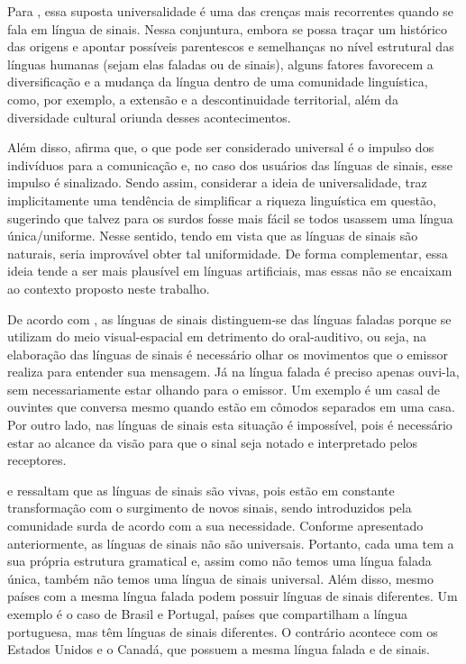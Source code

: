 Para , essa suposta universalidade é uma das crenças mais recorrentes quando se fala em língua de sinais. Nessa conjuntura, embora se possa traçar um histórico das origens e apontar possíveis parentescos e semelhanças no nível estrutural das línguas humanas (sejam elas faladas ou de sinais), alguns fatores favorecem a diversificação e a mudança da língua dentro de uma comunidade linguística, como, por exemplo, a extensão e a descontinuidade territorial, além da diversidade cultural oriunda desses acontecimentos.

Além disso,  afirma que, o que pode ser considerado universal é o impulso dos indivíduos para a comunicação e, no caso dos usuários das línguas de sinais, esse impulso é sinalizado. Sendo assim, considerar a ideia de universalidade, traz implicitamente uma tendência de simplificar a riqueza linguística em questão, sugerindo que talvez para os surdos fosse mais fácil se todos usassem uma língua única/uniforme. Nesse sentido, tendo em vista que as línguas de sinais são naturais, seria improvável obter tal uniformidade. De forma complementar, essa ideia tende a ser mais plausível em línguas artificiais, mas essas não se encaixam ao contexto proposto neste trabalho.

De acordo com , as línguas de sinais distinguem-se das línguas faladas porque se utilizam do meio visual-espacial em detrimento do oral-auditivo, ou seja, na elaboração das línguas de sinais é necessário olhar os movimentos que o emissor realiza para entender sua mensagem. Já na língua falada é preciso apenas ouvi-la, sem necessariamente estar olhando para o emissor. Um exemplo é um casal de ouvintes que conversa mesmo quando estão em cômodos separados em uma casa. Por outro lado, nas línguas de sinais esta situação é impossível, pois é necessário estar ao alcance da visão para que o sinal seja notado e interpretado pelos receptores.

 e  ressaltam que as línguas de sinais são vivas, pois estão em constante transformação com o surgimento de novos sinais, sendo introduzidos pela comunidade surda de acordo com a sua necessidade. Conforme apresentado anteriormente, as línguas de sinais não são universais. Portanto, cada uma tem a sua própria estrutura gramatical e, assim como não temos uma língua falada única, também não temos uma língua de sinais universal. Além disso, mesmo países com a mesma língua falada podem possuir línguas de sinais diferentes. Um exemplo é o caso de Brasil e Portugal, países que compartilham a língua portuguesa, mas têm línguas de sinais diferentes. O contrário acontece com os Estados Unidos e o Canadá, que possuem a mesma língua falada e de sinais.


